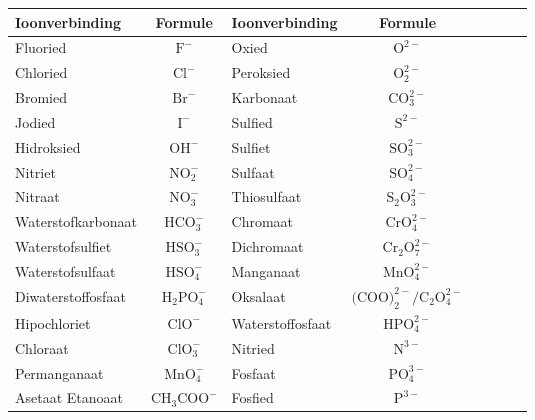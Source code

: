 \begin{enumerate}[noitemsep, label=\textbf{\arabic*}. ]
\begin{table}[H]
\begin{center}
\label{tab:anions}
\begin{tabular}{|l|c|l|c|l|c|l|c|} \hline
\textbf{Ioonverbinding} & \textbf{Formule}            & \textbf{Ioonverbinding} & \textbf{Formule} \\ \hline
Fluoried                & $\text{F}^{-}$             & Oxied               & $\text{O}^{2-}$ \\ \hline
Chloried                & $\text{Cl}^{-}$            & Peroksied           & $\text{O}_{2}^{2-}$ \\ \hline
Bromied                 & $\text{Br}^{-}$            & Karbonaat           & $\text{CO}_{3}^{2-}$ \\ \hline
Jodied                  & $\text{I}^{-}$             & Sulfied             & $\text{S}^{2-}$ \\ \hline
Hidroksied              & $\text{OH}^{-}$            & Sulfiet             & $\text{SO}_{3}^{2-}$ \\ \hline
Nitriet                 & $\text{NO}_{2}^{-}$        & Sulfaat             & $\text{SO}_{4}^{2-}$ \\ \hline
Nitraat                 & $\text{NO}_{3}^{-}$        & Thiosulfaat         & $\text{S}_{2}{\text{O}}_{3}^{2-}$ \\ \hline
Waterstofkarbonaat      & $\text{HCO}_{3}^{-}$       & Chromaat            & $\text{CrO}_{4}^{2-}$ \\ \hline
Waterstofsulfiet        & $\text{HSO}_{3}^{-}$       & Dichromaat          & $\text{Cr}_{2}{\text{O}}_{7}^{2-}$ \\ \hline
Waterstofsulfaat        & $\text{HSO}_{4}^{-}$       & Manganaat           & $\text{MnO}_{4}^{2-}$ \\ \hline
Diwaterstoffosfaat      & $\text{H}_{2}{\text{PO}}_{4}^{-}$ & Oksalaat     & $\text{(COO)}_{2}^{2-}/{\text{C}}_{2}{\text{O}}_{4}^{2-}$ \\ \hline
Hipochloriet            & $\text{ClO}^{-}$           & Waterstoffosfaat    & $\text{HPO}_{4}^{2-}$ \\ \hline
Chloraat                & $\text{ClO}_{3}^{-}$       & Nitried             & $\text{N}^{3-}$ \\ \hline
Permanganaat            & $\text{MnO}_{4}^{-}$       & Fosfaat             & $\text{PO}_{4}^{3-}$ \\ \hline
Asetaat Etanoaat        & $\text{CH}_{3}{\text{COO}}^{-}$   & Fosfied      & $\text{P}^{3-}$ \\ \hline
\end{tabular}


\end{center}
\end{table}
\end{enumerate}
